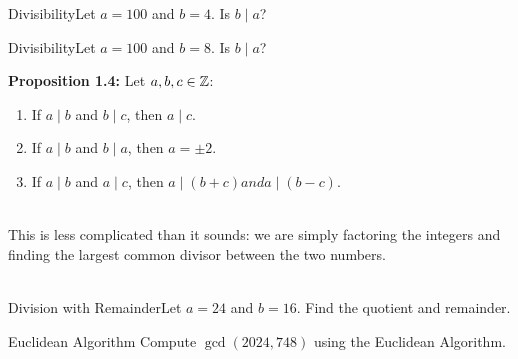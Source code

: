 \begin{example}
    {Divisibility}Let \(a = 100\) and \(b = 4\). Is \(b \mid a\)?
\end{example}


\begin{example}
    {Divisibility}Let \(a = 100\) and \(b = 8\). Is \(b \mid a\)?
\end{example}


\textbf{Proposition 1.4:} Let \(a,b,c \in \mathbb{Z}\):
\begin{enumerate}
    \item If \(a \mid b\) and \(b \mid c\), then \(a \mid c\).
    \item If \(a \mid b\) and \(b \mid a\), then \(a = \pm 2\).
    \item If \(a \mid b\) and \(a \mid c\), then \(a \mid (b + c) and a \mid (b - c)\).
\end{enumerate}


 \\

This is less complicated than it sounds: we are simply factoring the integers and finding the largest common divisor between the two numbers. \\

 \\

\begin{example}
    {Division with Remainder}Let \(a = 24\) and \(b = 16\). Find the quotient and remainder.
\end{example}

\begin{example}
    {Euclidean Algorithm} Compute \(\gcd(2024, 748)\) using the Euclidean Algorithm.
\end{example}

